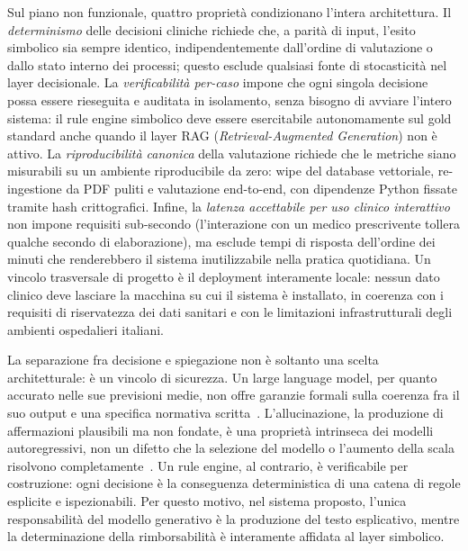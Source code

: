 Sul piano non funzionale, quattro proprietà condizionano l'intera architettura.
Il \emph{determinismo} delle decisioni cliniche richiede che,
a parità di input, l'esito simbolico sia sempre identico, indipendentemente
dall'ordine di valutazione o dallo stato interno dei processi;
questo esclude qualsiasi fonte di stocasticità nel layer decisionale.
La \emph{verificabilità per-caso} impone che ogni singola decisione possa
essere rieseguita e auditata in isolamento, senza bisogno di avviare
l'intero sistema: il rule engine simbolico deve essere esercitabile
autonomamente sul gold standard anche quando il layer RAG (\emph{Retrieval-Augmented Generation}) non è attivo.
La \emph{riproducibilità canonica} della valutazione richiede che
le metriche siano misurabili su un ambiente riproducibile da zero:
wipe del database vettoriale, re-ingestione da PDF puliti e valutazione
end-to-end, con dipendenze Python fissate tramite hash crittografici.
Infine, la \emph{latenza accettabile per uso clinico interattivo} non
impone requisiti sub-secondo (l'interazione con un medico prescrivente
tollera qualche secondo di elaborazione), ma esclude tempi di risposta
dell'ordine dei minuti che renderebbero il sistema inutilizzabile nella
pratica quotidiana.
Un vincolo trasversale di progetto è il deployment interamente locale:
nessun dato clinico deve lasciare la macchina su cui il sistema è installato,
in coerenza con i requisiti di riservatezza dei dati sanitari e con
le limitazioni infrastrutturali degli ambienti ospedalieri italiani.

La separazione fra decisione e spiegazione non è soltanto una scelta
architetturale: è un vincolo di sicurezza.
Un large language model, per quanto accurato nelle sue previsioni medie,
non offre garanzie formali sulla coerenza fra il suo output e una specifica
normativa scritta~\cite{ji2023hallucination}.
L'allucinazione, la produzione di affermazioni plausibili ma non fondate,
è una proprietà intrinseca dei modelli autoregressivi, non un difetto
che la selezione del modello o l'aumento della scala risolvono
completamente~\cite{thirunavukarasu2023llm}.
Un rule engine, al contrario, è verificabile per costruzione:
ogni decisione è la conseguenza deterministica di una catena di regole
esplicite e ispezionabili.
Per questo motivo, nel sistema proposto, l'unica responsabilità del
modello generativo è la produzione del testo esplicativo, mentre
la determinazione della rimborsabilità è interamente affidata
al layer simbolico.

